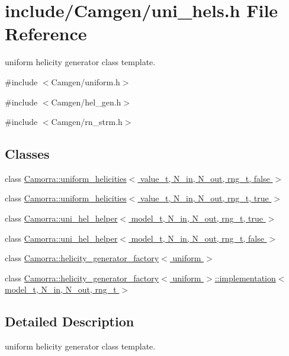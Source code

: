 \hypertarget{a00638}{
\section{include/Camgen/uni\_\-hels.h File Reference}
\label{a00638}
}


uniform helicity generator class template.  


{\ttfamily \#include $<$Camgen/uniform.h$>$}\par
{\ttfamily \#include $<$Camgen/hel\_\-gen.h$>$}\par
{\ttfamily \#include $<$Camgen/rn\_\-strm.h$>$}\par
\subsection*{Classes}
\begin{DoxyCompactItemize}
\item 
class \hyperlink{a00540}{Camorra::uniform\_\-helicities$<$ value\_\-t, N\_\-in, N\_\-out, rng\_\-t, false $>$}
\item 
class \hyperlink{a00541}{Camorra::uniform\_\-helicities$<$ value\_\-t, N\_\-in, N\_\-out, rng\_\-t, true $>$}
\item 
class \hyperlink{a00536}{Camorra::uni\_\-hel\_\-helper$<$ model\_\-t, N\_\-in, N\_\-out, rng\_\-t, true $>$}
\item 
class \hyperlink{a00535}{Camorra::uni\_\-hel\_\-helper$<$ model\_\-t, N\_\-in, N\_\-out, rng\_\-t, false $>$}
\item 
class \hyperlink{a00257}{Camorra::helicity\_\-generator\_\-factory$<$ uniform $>$}
\item 
class \hyperlink{a00272}{Camorra::helicity\_\-generator\_\-factory$<$ uniform $>$::implementation$<$ model\_\-t, N\_\-in, N\_\-out, rng\_\-t $>$}
\end{DoxyCompactItemize}


\subsection{Detailed Description}
uniform helicity generator class template. 